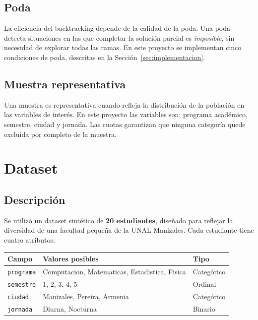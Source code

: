 \documentclass[12pt, a4paper]{article}
\begin{document}
\subsection{Poda}

La eficiencia del backtracking depende de la calidad de la poda. Una poda detecta situaciones en las que completar la solución parcial es \emph{imposible}, sin necesidad de explorar todas las ramas. En este proyecto se implementan cinco condiciones de poda, descritas en la Sección~\ref{sec:implementacion}.

\subsection{Muestra representativa}

Una muestra es representativa cuando refleja la distribución de la población en las variables de interés. En este proyecto las variables son: programa académico, semestre, ciudad y jornada. Las cuotas garantizan que ninguna categoría quede excluida por completo de la muestra.

\section{Dataset}

\subsection{Descripción}

Se utilizó un dataset sintético de \textbf{20 estudiantes}, diseñado para reflejar la diversidad de una facultad pequeña de la UNAL Manizales. Cada estudiante tiene cuatro atributos:

\begin{center}
\begin{tabular}{lll}
  \toprule
  \textbf{Campo} & \textbf{Valores posibles} & \textbf{Tipo} \\
  \midrule
  \texttt{programa} & Computacion, Matematicas, Estadistica, Fisica & Categórico \\
  \texttt{semestre} & 1, 2, 3, 4, 5 & Ordinal \\
  \texttt{ciudad}   & Manizales, Pereira, Armenia & Categórico \\
  \texttt{jornada}  & Diurna, Nocturna & Binario \\
  \bottomrule
\end{tabular}
\end{center}
\end{document}
